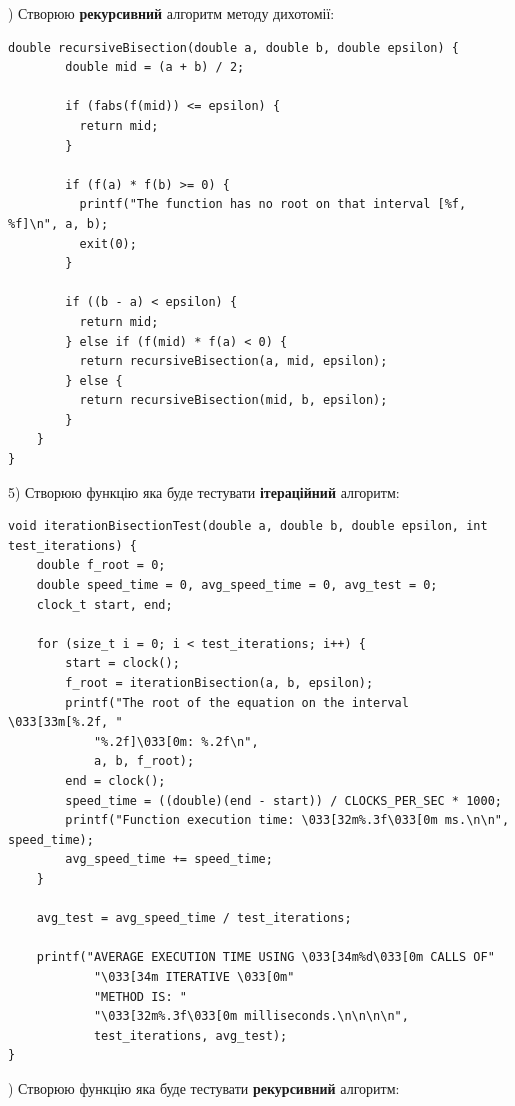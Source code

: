) Створюю \textbf{рекурсивний} алгоритм методу дихотомії:

\begin{lstlisting}[style=customc]
    double recursiveBisection(double a, double b, double epsilon) {
        double mid = (a + b) / 2;
      
        if (fabs(f(mid)) <= epsilon) {
          return mid;
        }
      
        if (f(a) * f(b) >= 0) {
          printf("The function has no root on that interval [%f, %f]\n", a, b);
          exit(0);
        }
      
        if ((b - a) < epsilon) {
          return mid;
        } else if (f(mid) * f(a) < 0) {
          return recursiveBisection(a, mid, epsilon); 
        } else {
          return recursiveBisection(mid, b, epsilon); 
        }
    }
}
\end{lstlisting}

5) Створюю функцію яка буде тестувати \textbf{ітераційний} алгоритм:

\begin{lstlisting}[style=customc]
void iterationBisectionTest(double a, double b, double epsilon, int test_iterations) {
    double f_root = 0;
    double speed_time = 0, avg_speed_time = 0, avg_test = 0;
    clock_t start, end;

    for (size_t i = 0; i < test_iterations; i++) {
        start = clock();
        f_root = iterationBisection(a, b, epsilon);
        printf("The root of the equation on the interval \033[33m[%.2f, "
            "%.2f]\033[0m: %.2f\n",
            a, b, f_root);
        end = clock();
        speed_time = ((double)(end - start)) / CLOCKS_PER_SEC * 1000;
        printf("Function execution time: \033[32m%.3f\033[0m ms.\n\n", speed_time);
        avg_speed_time += speed_time;
    }

    avg_test = avg_speed_time / test_iterations;

    printf("AVERAGE EXECUTION TIME USING \033[34m%d\033[0m CALLS OF"
            "\033[34m ITERATIVE \033[0m"
            "METHOD IS: "
            "\033[32m%.3f\033[0m milliseconds.\n\n\n\n",
            test_iterations, avg_test);
}
\end{lstlisting}

) Створюю функцію яка буде тестувати \textbf{рекурсивний} алгоритм:
    
